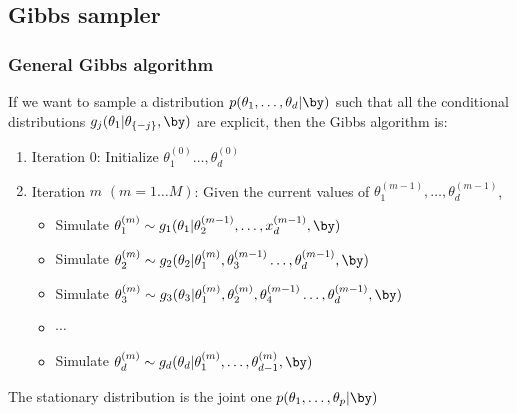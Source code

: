 \subsection[Gibbs]{Gibbs sampler} 
\begin{frame}\frametitle{General Gibbs algorithm}

If we want to sample a distribution  $p(\theta_1,\dots,\theta_d|\by)$  such that all the conditional distributions $g_j(\theta_1 | \theta_{\{-j\}},\by)$ are explicit, then the Gibbs algorithm is: 
\begin{block}{}
\begin{enumerate}
\item[] \vert Iteration 0:  \noir Initialize $\theta_1^{(0)} \dots, \theta_d^{(0)} $ 
\item[] \vert Iteration $m$ $(m=1\dots M)$: \noir  Given the current values of   $\theta_1^{(m-1)}, \dots, \theta_d^{(m-1)}$, 
\begin{itemize}
\item Simulate $\theta^{(m)}_1 \sim g_1(\theta_1 | \theta_2^{(m-1)}, \dots,x_d^{(m-1)},\by )$
\item Simulate  $\theta^{(m)}_2 \sim g_2(\theta_2 | \theta_1^{(m)}, \theta_3^{(m-1)}\dots,\theta_d^{(m-1)} ,\by)$
\item Simulate $\theta^{(m)}_3 \sim g_3(\theta_3 | \theta_1^{(m)},  \theta_2^{(m)}, \theta_4^{(m-1)}\dots,\theta_d^{(m-1)},\by)$
\item $\cdots$
\item  Simulate $\theta^{(m)}_d \sim g_d(\theta_d | \theta_1^{(m)}, \dots,\theta_{d-1}^{(m )},\by )$
\end{itemize}
\end{enumerate}
\end{block}
The stationary distribution is the joint one $p(\theta_1,\dots,\theta_p|\by)$



\end{frame}



